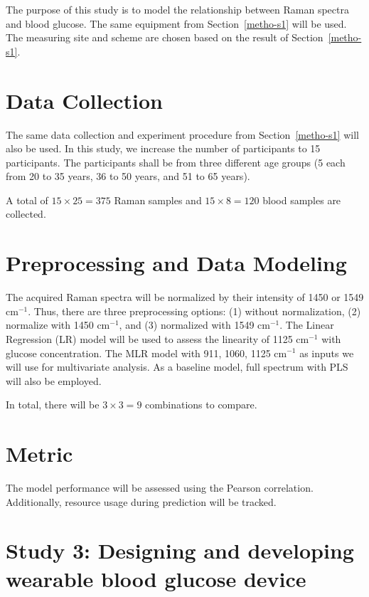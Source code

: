 The purpose of this study is to model the relationship between Raman spectra and blood glucose.
The same equipment from Section~\ref{metho-s1} will be used.
The measuring site and scheme are chosen based on the result of Section~\ref{metho-s1}.

\section{Data Collection}

The same data collection and experiment procedure from Section~\ref{metho-s1} will also be used.
In this study, we increase the number of participants to 15 participants.
The participants shall be from three different age groups (5 each from 20 to 35 years, 36 to 50 years, and 51 to 65 years).

A total of $15 \times 25 =  375$ Raman samples and $15 \times 8 = 120$ blood samples are collected.

\section{Preprocessing and Data Modeling}

The acquired Raman spectra will be normalized by their intensity of 1450 or 1549 $\text{cm}^{-1}$.
Thus, there are three preprocessing options: (1) without normalization, (2) normalize with 1450 $\text{cm}^{-1}$, and (3) normalized with 1549 $\text{cm}^{-1}$.
The Linear Regression (LR) model will be used to assess the linearity of 1125 $\text{cm}^{-1}$ with glucose concentration.
The MLR model with 911, 1060, 1125 $\text{cm}^{-1}$ as inputs we will use for multivariate analysis.
As a baseline model, full spectrum with PLS will also be employed.

In total, there will be $3 \times 3 = 9$ combinations to compare.

\section{Metric}

The model performance will be assessed using the Pearson correlation.
Additionally, resource usage during prediction will be tracked.

\section{Study 3: Designing and developing wearable blood glucose device}

